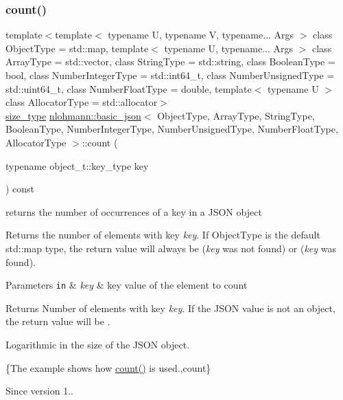 \subsubsection{\texorpdfstring{count()}{count()}}
{\footnotesize\ttfamily template$<$template$<$ typename U, typename V, typename... Args $>$ class Object\+Type = std\+::map, template$<$ typename U, typename... Args $>$ class Array\+Type = std\+::vector, class String\+Type  = std\+::string, class Boolean\+Type  = bool, class Number\+Integer\+Type  = std\+::int64\+\_\+t, class Number\+Unsigned\+Type  = std\+::uint64\+\_\+t, class Number\+Float\+Type  = double, template$<$ typename U $>$ class Allocator\+Type = std\+::allocator$>$ \\
\hyperlink{classnlohmann_1_1basic__json_a1579a8f72a230358d6cd1a6e8a62859b}{size\+\_\+type} \hyperlink{classnlohmann_1_1basic__json}{nlohmann\+::basic\+\_\+json}$<$ Object\+Type, Array\+Type, String\+Type, Boolean\+Type, Number\+Integer\+Type, Number\+Unsigned\+Type, Number\+Float\+Type, Allocator\+Type $>$\+::count (\begin{DoxyParamCaption}\item[{typename object\+\_\+t\+::key\+\_\+type}]{key }\end{DoxyParamCaption}) const\hspace{0.3cm}{\ttfamily [inline]}}



returns the number of occurrences of a key in a J\+S\+ON object 

Returns the number of elements with key {\itshape key}. If Object\+Type is the default {\ttfamily std\+::map} type, the return value will always be {} ({\itshape key} was not found) or {} ({\itshape key} was found).


\begin{DoxyParams}[1]{Parameters}
\mbox{\tt in}  & {\em key} & key value of the element to count\\
\hline
\end{DoxyParams}
\begin{DoxyReturn}{Returns}
Number of elements with key {\itshape key}. If the J\+S\+ON value is not an object, the return value will be {}.
\end{DoxyReturn}
Logarithmic in the size of the J\+S\+ON object.

\{The example shows how {\ttfamily \hyperlink{classnlohmann_1_1basic__json_a20d85eb83c2c0cfa0918f630b192635c}{count()}} is used.,count\}

\begin{DoxySince}{Since}
version 1.. 
\end{DoxySince}
\hypertarget{classnlohmann_1_1basic__json_a060b33f8f255986088652625f9d50681}{}\label{classnlohmann_1_1basic__json_a060b33f8f255986088652625f9d50681} 
